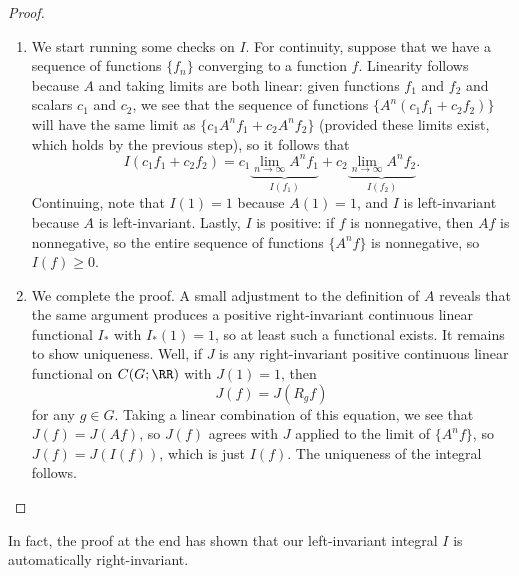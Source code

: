 \documentclass[../notes.tex]{subfiles}
\begin{document}
\begin{proof}
\begin{enumerate}[resume]
		\item We start running some checks on $I$. For continuity, suppose that we have a sequence of functions $\{f_n\}$ converging to a function $f$. Linearity follows because $A$ and taking limits are both linear: given functions $f_1$ and $f_2$ and scalars $c_1$ and $c_2$, we see that the sequence of functions $\{A^n(c_1f_1+c_2f_2)\}$ will have the same limit as $\{c_1A^nf_1+c_2A^nf_2\}$ (provided these limits exist, which holds by the previous step), so it follows that
		\[I(c_1f_1+c_2f_2)=c_1\underbrace{\lim_{n\to\infty}A^nf_1}_{I(f_1)}+c_2\underbrace{\lim_{n\to\infty}A^nf_2}_{I(f_2)}.\]
		Continuing, note that $I(1)=1$ because $A(1)=1$, and $I$ is left-invariant because $A$ is left-invariant. Lastly, $I$ is positive: if $f$ is nonnegative, then $Af$ is nonnegative, so the entire sequence  of functions $\{A^nf\}$ is nonnegative, so $I(f)\ge0$.

		\item We complete the proof. A small adjustment to the definition of $A$ reveals that the same argument produces a positive right-invariant continuous linear functional $I_*$ with $I_*(1)=1$, so at least such a functional exists. It remains to show uniqueness. Well, if $J$ is any right-invariant positive continuous linear functional on $C(G;\RR)$ with $J(1)=1$, then
		\[J(f)=J(R_gf)\]
		for any $g\in G$. Taking a linear combination of this equation, we see that $J(f)=J(Af)$, so $J(f)$ agrees with $J$ applied to the limit of $\{A^nf\}$, so $J(f)=J(I(f))$, which is just $I(f)$. The uniqueness of the integral follows.
		\qedhere
	\end{enumerate}
\end{proof}
\begin{remark}
	In fact, the proof at the end has shown that our left-invariant integral $I$ is automatically right-invariant.
\end{remark}
\end{document}
